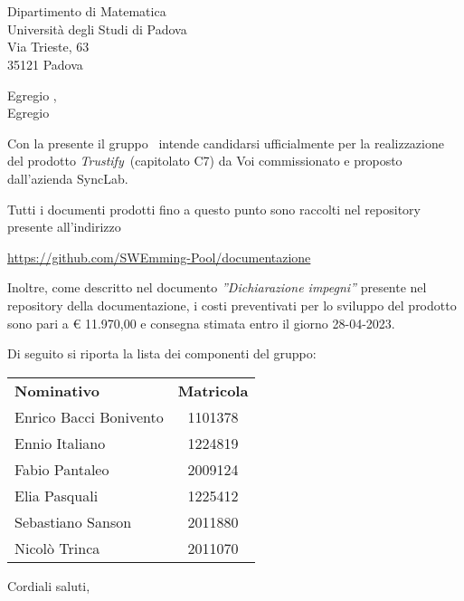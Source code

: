 \documentclass[12pt, boldsubject, italicsignature, noindent]{letteracdp}
\date{}
\renewcommand{\capName}{\textit{Trustify}} %
\renewcommand{\capCode}{C7} %
\renewcommand{\capProposer}{SyncLab} %
\begin{document}
\begin{letter}{
        \Vardanega \\
        \Cardin \\
        Dipartimento di Matematica \\
        Università degli Studi di Padova \\
        Via Trieste, 63 \\ 35121 Padova
    }

    \opening{Egregio \vardanega,\\ Egregio \cardin}

    Con la presente il gruppo \groupName\ intende candidarsi ufficialmente per la realizzazione del prodotto \capName\ (capitolato \capCode) da Voi commissionato e proposto dall'azienda \capProposer.

    Tutti i documenti prodotti fino a questo punto sono raccolti nel repository presente all'indirizzo
    \begin{center}
        \url{https://github.com/SWEmming-Pool/documentazione}
        \hfill{}
    \end{center}

    Inoltre, come descritto nel documento \textit{''Dichiarazione impegni''} presente nel repository della documentazione, i costi preventivati per lo sviluppo del prodotto sono pari a \euro{} 11.970,00 e consegna stimata entro il giorno 28-04-2023.

    \pagebreak

    Di seguito si riporta la lista dei componenti del gruppo:

    \begin{center}
        \begin{tabular}{l|c}
            \textbf{Nominativo}    & \textbf{Matricola} \\
            Enrico Bacci Bonivento & 1101378            \\
            Ennio Italiano         & 1224819            \\
            Fabio Pantaleo         & 2009124            \\
            Elia Pasquali          & 1225412            \\
            Sebastiano Sanson      & 2011880            \\
            Nicolò Trinca          & 2011070
        \end{tabular}
    \end{center}

    \closing{Cordiali saluti,}

\end{letter}
\end{document}
